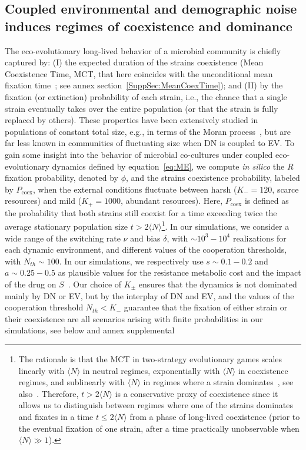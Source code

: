 \documentclass{article}
\begin{document}
\subsection{Coupled environmental and demographic noise induces regimes of coexistence and dominance}\label{Sec:PhaseDiagram}

The eco-evolutionary long-lived behavior of a microbial community is chiefly captured by: (I) the expected duration of the strains coexistence (Mean Coexistence Time, MCT,  that here coincides with the unconditional mean fixation  time~\cite{Ewens,antal2006fixation}; see annex section~\ref{SuppSec:MeanCoexTime}); and (II) by the fixation (or extinction) probability of each strain, i.e., the chance that a single strain eventually takes over the entire population (or that the strain is fully replaced by others). These properties have been extensively studied in populations of constant total size, e.g., in terms of the Moran process~\cite{Moran, Gardiner, Ewens, antal2006fixation, Blythe07, traulsen2009stochastic,pinero2022fixation}, but are far less known in communities of fluctuating size when DN is coupled to EV. To gain some insight into the behavior of microbial co-cultures under coupled eco-evolutionary dynamics defined by equation~\eqref{eq:ME}, we compute {\it in silico} the $R$ fixation probability, denoted by \(\phi\), and the strains coexistence probability, labeled by \(P_{\text{coex}}\), when the external conditions fluctuate between harsh (\(K_-=120\), scarce resources) and mild (\(K_+=1000\), abundant resources). Here, \(P_{\text{coex}}\) is defined as the probability that both strains still coexist for a time exceeding twice the average stationary population size \(t>2\langle N\rangle\)\footnote{The rationale is that the MCT in two-strategy evolutionary games scales linearly with $\langle N\rangle$ in neutral regimes, exponentially with $\langle N\rangle$ in coexistence regimes, and sublinearly with $\langle N\rangle$ in regimes where a strain dominates~\cite{antal2006fixation,cremer2009edge,AM10,AM11,AHNRM23}, see also~\cite{reich2007,he2011}. Therefore, \(t>2\langle N\rangle\) is a conservative proxy of coexistence since it allows us to distinguish between regimes where one of the strains dominates and fixates in a time $t\leq 2\langle N\rangle$ from a phase of long-lived coexistence (prior to the eventual fixation of one strain, after a time practically unobservable when $\langle N\rangle \gg 1$).}. In our simulations, we consider a wide range of the switching rate \(\nu\) and bias \(\delta\), with \(\sim10^{3}-10^{4}\) realizations for each dynamic environment, and different values of the cooperation thresholds, with \(N_{th}\sim100\). In our simulations, we respectively use \(s\sim0.1-0.2\) and \(a\sim0.25-0.5\) as plausible values for the resistance metabolic cost and the impact of the drug on $S$~\cite{van2011novo, melnyk2015fitness}. Our choice of $K_{\pm}$ ensures that the dynamics is not dominated mainly by DN or EV, but by the interplay of DN and EV, and the values of the cooperation threshold $N_{th}<K_-$ guarantee that the fixation of either strain or their coexistence are all scenarios arising with finite probabilities in our simulations, see below and annex supplemental 
\end{document}
